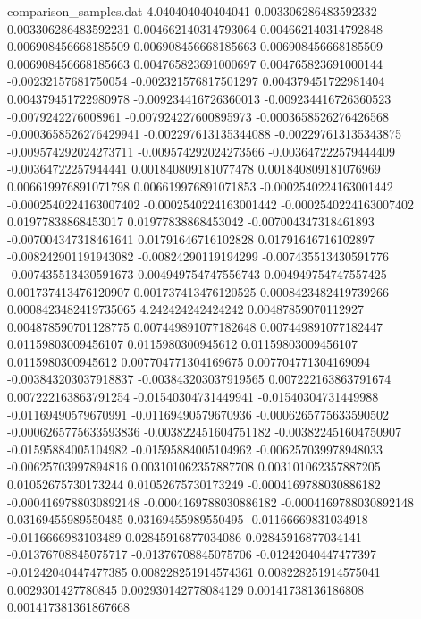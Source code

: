 \begin{filecontents}{comparison_samples.dat}
4.040404040404041   0.003306286483592332    0.003306286483592231    0.004662140314793064   0.004662140314792848   0.006908456668185509   0.006908456668185663   0.006908456668185509   0.006908456668185663   0.004765823691000697   0.004765823691000144   -0.00232157681750054    -0.002321576817501297   0.004379451722981404   0.004379451722980978   -0.009234416726360013   -0.009234416726360523   -0.0079242276008961     -0.007924227600895973   -0.0003658526276426568  -0.0003658526276429941  -0.002297613135344088   -0.002297613135343875   -0.009574292024273711   -0.009574292024273566   -0.003647222579444409   -0.00364722257944441    0.001840809181077478   0.001840809181076969   0.006619976891071798   0.006619976891071853   -0.0002540224163001442  -0.0002540224163007402  -0.0002540224163001442  -0.0002540224163007402  0.01977838868453017    0.01977838868453042    -0.007004347318461893   -0.007004347318461641   0.01791646716102828    0.01791646716102897    -0.008242901191943082   -0.00824290119194299    -0.007435513430591776   -0.007435513430591673   0.004949754747556743   0.004949754747557425   0.001737413476120907   0.001737413476120525   0.0008423482419739266   0.0008423482419735065 
4.242424242424242   0.00487859070112927     0.004878590701128775    0.007449891077182648   0.007449891077182447   0.01159803009456107    0.0115980300945612     0.01159803009456107    0.0115980300945612     0.007704771304169675   0.007704771304169094   -0.003843203037918837   -0.003843203037919565   0.007222163863791674   0.007222163863791254   -0.01540304731449941    -0.01540304731449988    -0.01169490579670991    -0.01169490579670936    -0.0006265775633590502  -0.0006265775633593836  -0.003822451604751182   -0.003822451604750907   -0.01595884005104982    -0.01595884005104962    -0.006257039978948033   -0.00625703997894816    0.003101062357887708   0.003101062357887205   0.01052675730173244    0.01052675730173249    -0.0004169788030886182  -0.0004169788030892148  -0.0004169788030886182  -0.0004169788030892148  0.03169455989550485    0.03169455989550495    -0.01166669831034918    -0.0116666983103489     0.02845916877034086    0.02845916877034141    -0.01376708845075717    -0.01376708845075706    -0.01242040447477397    -0.01242040447477385    0.008228251914574361   0.008228251914575041   0.0029301427780845     0.002930142778084129   0.00141738136186808     0.001417381361867668  

\end{filecontents}
